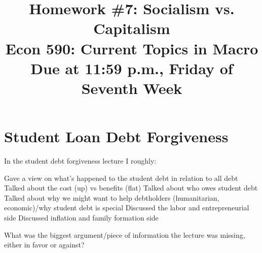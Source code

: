 \documentclass[a4paper]{article}
\title{{\Large \bf Homework \#7: Socialism vs. Capitalism} \\ \small Econ 590: Current Topics in Macro \\ \small Due at  11:59 p.m., Friday of Seventh Week}
\date{}
\renewcommand{\item}{\itemindent1cm\itemold}
\begin{document}
\maketitle
 
\noindent

\section*{Student Loan Debt Forgiveness}
In the student debt forgiveness lecture I roughly:
\begin{itemize}
\item Gave a view on what's happened to the student debt in relation to all debt
\item Talked about the cost (up) vs benefits (flat)
\item Talked about who owes student debt
\item Talked about why we might want to help debtholders (humanitarian, economic)/why student debt is special 
\item Discussed the labor and entrepreneurial side
\item Discussed inflation and family formation side
\end{itemize}
What was the biggest argument/piece of information the lecture was missing, either in favor or against?  
\end{document}

